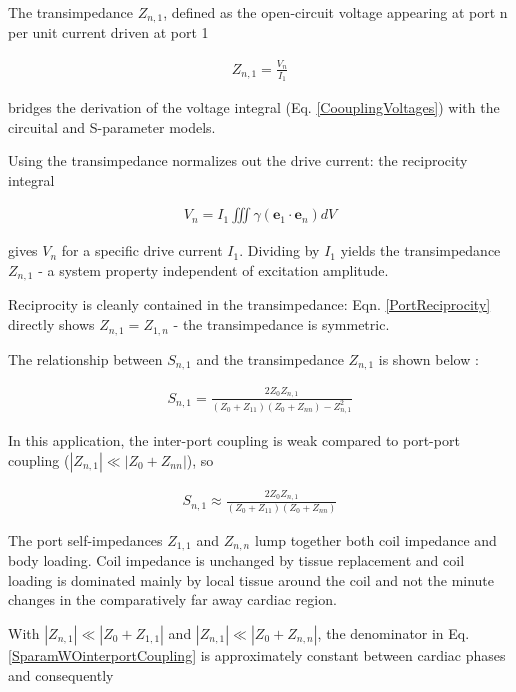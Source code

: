 The transimpedance $Z_{n,1}$, defined as the open-circuit voltage appearing at port n per unit current driven at port 1

\begin{align}
    \label{transZ}
    Z_{n,1} = \frac{V_n}{I_1}
\end{align}

bridges the derivation of the voltage integral (Eq. \eqref{CoouplingVoltages}) with the circuital and S-parameter models.

Using the transimpedance normalizes out the drive current: the reciprocity integral

\begin{align}
    \label{recInt}
    V_n = I_1 \iiint \gamma (\mathbf{e}_1 \cdot \mathbf{e}_n) dV
\end{align}

gives $V_n$ for a specific drive current $I_1$. Dividing by $I_1$ yields the transimpedance $Z_{n,1}$ - a system property independent of excitation amplitude.

Reciprocity is cleanly contained in the transimpedance: Eqn. \eqref{PortReciprocity} directly shows $Z_{n,1} = Z_{1,n}$ - the transimpedance is symmetric.

The relationship between $S_{n,1}$ and the transimpedance $Z_{n,1}$ is shown below \cite{Pozar2012Microwave}:

\begin{align}
    \label{SandZ}
    S_{n,1} = \frac{2Z_0Z_{n,1}}{(Z_0 + Z_{11})(Z_0 + Z_{nn}) - Z_{n,1}^2}
\end{align}

In this application, the inter-port coupling is weak compared to port-port coupling ($|Z_{n,1}| \ll |Z_0 + Z_{nn}|$), so

\begin{align}
    \label{SparamWOinterportCoupling}
    S_{n,1} \approx \frac{2Z_0 Z_{n,1}}{(Z_0 + Z_{11})(Z_0 + Z_{nn})}
\end{align}

The port self-impedances $Z_{1,1}$ and $Z_{n,n}$ lump together both coil impedance and body loading. Coil impedance is unchanged by tissue replacement and coil loading is dominated mainly by local tissue around the coil and not the minute changes in the comparatively far away cardiac region.

With $|Z_{n,1}| \ll |Z_{0} + Z_{1,1}|$ and $|Z_{n,1}| \ll |Z_{0} + Z_{n,n}|$, the denominator in Eq. \eqref{SparamWOinterportCoupling} is approximately constant between cardiac phases and consequently

